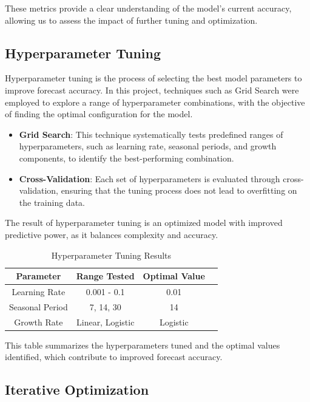 These metrics provide a clear understanding of the model's current accuracy, allowing us to assess the impact of further tuning and optimization.

\subsection{Hyperparameter Tuning}

Hyperparameter tuning is the process of selecting the best model parameters to improve forecast accuracy. In this project, techniques such as Grid Search were employed to explore a range of hyperparameter combinations, with the objective of finding the optimal configuration for the model.

\begin{itemize}
    \item \textbf{Grid Search}: This technique systematically tests predefined ranges of hyperparameters, such as learning rate, seasonal periods, and growth components, to identify the best-performing combination.
    \item \textbf{Cross-Validation}: Each set of hyperparameters is evaluated through cross-validation, ensuring that the tuning process does not lead to overfitting on the training data.
\end{itemize}

The result of hyperparameter tuning is an optimized model with improved predictive power, as it balances complexity and accuracy.

\begin{table}[H]
\centering
\caption{Hyperparameter Tuning Results}
\begin{tabular}{|c|c|c|c|}
\hline
\textbf{Parameter} & \textbf{Range Tested} & \textbf{Optimal Value} \\ \hline
Learning Rate & 0.001 - 0.1 & 0.01 \\ \hline
Seasonal Period & 7, 14, 30 & 14 \\ \hline
Growth Rate & Linear, Logistic & Logistic \\ \hline
\end{tabular}
\end{table}

This table summarizes the hyperparameters tuned and the optimal values identified, which contribute to improved forecast accuracy.

\subsection{Iterative Optimization}

